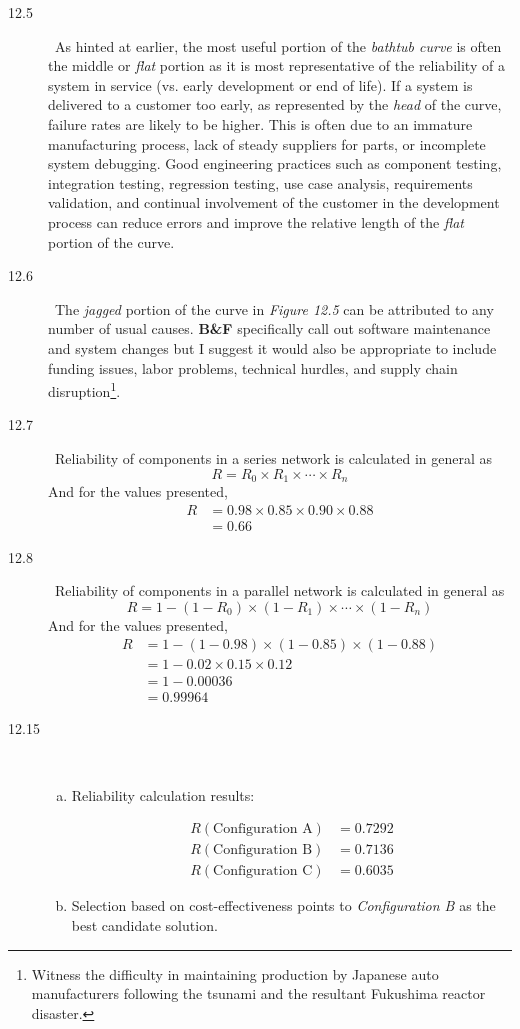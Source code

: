 \documentclass[letterpaper,10pt]{article}
\begin{document}
\begin{description}
\item[12.5]\ 
As hinted at earlier, the most useful portion of the \emph{bathtub curve} is often the middle or \emph{flat} portion as it is most representative of the reliability of a system in service (vs. early development or end of life).  If a system is delivered to a customer too early, as represented by the \emph{head} of the curve, failure rates are likely to be higher.  This is often due to an immature manufacturing process, lack of steady suppliers for parts, or incomplete system debugging.  Good engineering practices such as component testing, integration testing, regression testing, use case analysis, requirements validation, and continual involvement of the customer in the development process can reduce errors and improve the relative length of the \emph{flat} portion of the curve.

\item[12.6]\ 
The \emph{jagged} portion of the curve in \emph{Figure 12.5} can be attributed to any number of usual causes.  \textbf{B\&F} specifically call out software maintenance and system changes but I suggest it would also be appropriate to include funding issues, labor problems, technical hurdles, and supply chain disruption\footnote{Witness the difficulty in maintaining production by Japanese auto manufacturers following the tsunami and the resultant Fukushima reactor disaster.}.

\item[12.7]\ 
Reliability of components in a series network is calculated in general as \[R=R_{0}\times R_{1}\times\cdots\times R_{n}\]And for the values presented,
\begin{align*}
R&=0.98\times 0.85\times 0.90\times 0.88 \\
&= 0.66
\end{align*}

\item[12.8]\ 
Reliability of components in a parallel network is calculated in general as\[R=1-(1-R_{0})\times(1-R_{1})\times\cdots\times(1-R_{n})\]And for the values presented,
\begin{align*}
R&=1-(1-0.98)\times(1-0.85)\times(1-0.88) \\
&= 1-0.02\times 0.15\times 0.12 \\
&= 1-0.00036 \\
&= 0.99964
\end{align*}

\item[12.15]\ 
\begin{enumerate}[a)]
\item Reliability calculation results:

\begin{align*}
R(\mbox{Configuration A}) &= 0.7292 \\
R(\mbox{Configuration B}) &= 0.7136 \\
R(\mbox{Configuration C}) &= 0.6035
\end{align*}

\item Selection based on cost-effectiveness points to \emph{Configuration B} as the best candidate solution.
\end{enumerate}

\end {description}
\end{document}
